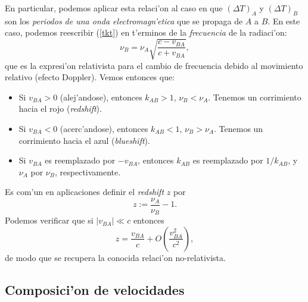 En particular, podemos aplicar esta relaci'on al caso en que $(\Delta T)_A$ y
$(\Delta T)_B$ son los \textit{periodos de una onda electromagn'etica} que se propaga de $A$ a $B$. En este caso, podemos reescribir (\ref{tkt}) en t'erminos de la \textit{frecuencia} de la radiaci'on:
\begin{equation}
\nu_B=\nu_A\sqrt{\frac{c-v_{BA}}{c+v_{BA}}},
\end{equation}
que es la expresi'on relativista para el cambio de frecuencia debido al movimiento relativo (efecto Doppler). Vemos entonces que:
\begin{itemize}
\item Si $v_{BA}>0$ (alej'andose), entonces $k_{AB}>1$, $\nu_B <
\nu_A$.
Tenemos un corrimiento hacia el rojo (\textit{redshift}).
\item Si $v_{BA}<0$ (acerc'andose), entonces $k_{AB}<1$, $\nu_B >
\nu_A$.
Tenemos un corrimiento hacia el azul (\textit{blueshift}).
\item Si $v_{BA}$ es reemplazado por $-v_{BA}$, entonces $k_{AB}$ es reemplazado
por $1/{k_{AB}}$, y $\nu_A$ por $\nu_B$, respectivamente.
\end{itemize}
Es com'un en aplicaciones definir el \textit{redshift} $z$ por
\begin{equation}
z:=\frac{\nu_A}{\nu_B}-1.
\end{equation}
Podemos verificar que si $|v_{BA}|\ll c$ entonces 
\begin{equation}
z=\frac{v_{BA}}{c}+O(\frac{v_{BA}^2}{c^2}),
\end{equation}
de modo que se recupera la conocida relaci'on no-relativista.

\subsection{Composici'on de velocidades}

